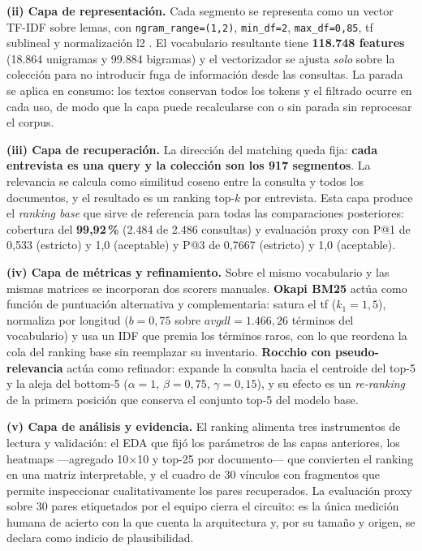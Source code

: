 \documentclass[11pt]{tg_usta}
\begin{document}
\textbf{(ii) Capa de representación.} Cada segmento se representa como un vector TF-IDF sobre lemas, con \texttt{ngram\_range=(1,2)}, \texttt{min\_df=2}, \texttt{max\_df=0,85}, tf sublineal y normalización l2 \cite{salton1988term,manning2008introduction,scikit2024tfidf}. El vocabulario resultante tiene \textbf{118.748 features} (18.864 unigramas y 99.884 bigramas) y el vectorizador se ajusta \emph{solo} sobre la colección para no introducir fuga de información desde las consultas. La parada se aplica en consumo: los textos conservan todos los tokens y el filtrado ocurre en cada uso, de modo que la capa puede recalcularse con o sin parada sin reprocesar el corpus.

\textbf{(iii) Capa de recuperación.} La dirección del matching queda fija: \textbf{cada entrevista es una query y la colección son los 917 segmentos}. La relevancia se calcula como similitud coseno entre la consulta y todos los documentos, y el resultado es un ranking top-$k$ por entrevista. Esta capa produce el \emph{ranking base} que sirve de referencia para todas las comparaciones posteriores: cobertura del \textbf{99,92\,\%} (2.484 de 2.486 consultas) y evaluación proxy con P@1 de 0,533 (estricto) y 1,0 (aceptable) y P@3 de 0,7667 (estricto) y 1,0 (aceptable).

\textbf{(iv) Capa de métricas y refinamiento.} Sobre el mismo vocabulario y las mismas matrices se incorporan dos scorers manuales. \textbf{Okapi BM25} \cite{robertson1994simple,robertson2009probabilistic} actúa como función de puntuación alternativa y complementaria: satura el tf ($k_1=1{,}5$), normaliza por longitud ($b=0{,}75$ sobre $avgdl=1.466{,}26$ términos del vocabulario) y usa un IDF que premia los términos raros, con lo que reordena la cola del ranking base sin reemplazar su inventario. \textbf{Rocchio con pseudo-relevancia} \cite{rocchio1971relevance} actúa como refinador: expande la consulta hacia el centroide del top-5 y la aleja del bottom-5 ($\alpha=1$, $\beta=0{,}75$, $\gamma=0{,}15$), y su efecto es un \emph{re-ranking} de la primera posición que conserva el conjunto top-5 del modelo base.

\textbf{(v) Capa de análisis y evidencia.} El ranking alimenta tres instrumentos de lectura y validación: el EDA que fijó los parámetros de las capas anteriores, los heatmaps ---agregado 10$\times$10 y top-25 por documento--- que convierten el ranking en una matriz interpretable, y el cuadro de 30 vínculos con fragmentos que permite inspeccionar cualitativamente los pares recuperados. La evaluación proxy sobre 30 pares etiquetados por el equipo cierra el circuito: es la única medición humana de acierto con la que cuenta la arquitectura y, por su tamaño y origen, se declara como indicio de plausibilidad.
\end{document}
